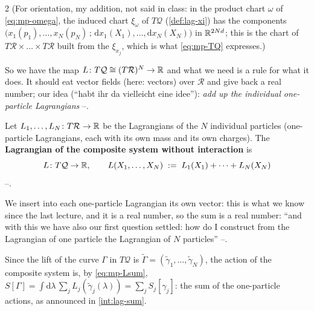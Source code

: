 \begin{paracol}{2}
(For orientation, my addition, not said in class: in the product chart $\omega$ of \eqref{eq:mp-omega}, the induced chart $\xi_\omega$ of $T\mathcal Q$ (\cref{def:lag-xi}) has the components $\bigl(x_1(p_1),\dots,x_N(p_N)\,;\,\mathrm dx_1(X_1),\dots,\mathrm dx_N(X_N)\bigr)$ in $\mathbb{R}^{2Nd}$; this is the chart of $T\mathcal R\times\dots\times T\mathcal R$ built from the $\xi_{x_j}$, which is what \eqref{eq:mp-TQ} expresses.)

So we have the map $L\colon T\mathcal Q\cong(T\mathcal R)^N\to\mathbb{R}$ and what we need is a rule for what it does. It should eat vector fields (here: vectors) over $\mathcal R$ and give back a real number; our idea (``habt ihr da vielleicht eine idee''): \emph{add up the individual one-particle Lagrangians} --.

\begin{definition}\label{def:mp-Lsum}
Let $L_1,\dots,L_N\colon T\mathcal R\to\mathbb{R}$ be the Lagrangians of the $N$ individual particles (one-particle Lagrangians, each with its own mass and its own charges). The \textbf{Lagrangian of the composite system without interaction} is
\begin{equation}\label{eq:mp-Lsum}
  L\colon T\mathcal Q\to\mathbb{R},\qquad L(X_1,\dots,X_N)\;:=\;L_1(X_1)+\dots+L_N(X_N)
\end{equation}
--.
\end{definition}
We insert into each one-particle Lagrangian its own vector: this is what we know since the last lecture, and it is a real number, so the sum is a real number: ``and with this we have also our first question settled: how do I construct from the Lagrangian of one particle the Lagrangian of $N$ particles'' --.

\begin{intuition}\label{int:mp-sum}
Since the lift of the curve $\Gamma$ in $T\mathcal Q$ is $\tilde\Gamma=(\tilde\gamma_1,\dots,\tilde\gamma_N)$, the action of the composite system is, by \eqref{eq:mp-Lsum}, $S[\Gamma]=\int\mathrm d\lambda\,\sum_jL_j(\tilde\gamma_j(\lambda))=\sum_jS_j[\gamma_j]$: the sum of the one-particle actions, as announced in \cref{int:lag-sum}.
\end{intuition}


\end{paracol}
